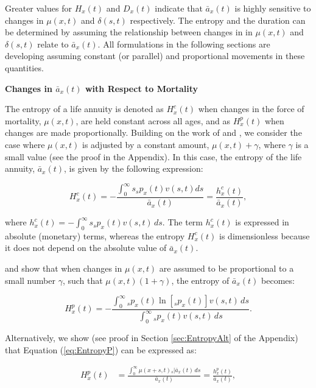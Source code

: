 \documentclass[12pt]{article}
\begin{document}
Greater values for ${H}_{x}(t)$ and ${D}_{x}(t)$ indicate that $\bar{a}_x(t)$ is highly sensitive to changes in $\mu(x,t)$ and $\delta(s,t)$ respectively. The entropy and the duration can be determined by assuming the relationship between changes in in $\mu(x,t)$ and $\delta(s,t)$ relate to $\bar{a}_x(t)$. All formulations in the following sections are developing assuming constant (or parallel) and proportional movements in these quantities.

\textbf{{Changes in $\bar{a}_x(t)$ with Respect to Mortality}}


The entropy of a life annuity is denoted as ${H}^{c}_{x}(t)$ when changes in the force of mortality, $\mu(x,t)$, are held constant across all ages, and as ${H}^{p}_{x}(t)$ when changes are made proportionally. Building on the work of \citet{Tsai2013a} and \citet{Lin2020}, we consider the case where $\mu(x,t)$ is adjusted by a constant amount, $\mu(x,t) + \gamma$, where $\gamma$ is a small value (see the proof in the Appendix). In this case, the entropy of the life annuity, $\bar{a}_x(t)$, is given by the following expression:


\begin{equation}\label{eq:EntropyC}
{H}^{c}_{x}(t) = -\frac{\int_{0}^\infty s {}_sp_x(t) {v}(s,t) ds}{\bar{a}_x(t)}=\frac{{h}^{c}_{x}(t)}{\bar{a}_x(t)},
\end{equation}

where ${h}^{c}_{x}(t)=-\int_{0}^\infty s {}_s p_x(t) {v}(s,t) \, ds$. The term ${h}^{c}_{x}(t)$ is expressed in absolute (monetary) terms, whereas the entropy ${H}^{c}_{x}(t)$ is dimensionless because it does not depend on the absolute value of $\bar{a}_x(t)$.

\citet{Haberman2011} and \citet{Tsai2013a} show that when changes in $\mu(x,t)$ are assumed to be proportional to a small number $\gamma$, such that $\mu(x,t)(1+\gamma)$, the entropy of $\bar{a}_x(t)$ becomes:

\begin{equation} \label{eq:EntropyP}
	{H}^{p}_{x}(t) = -\frac{ \int_{0}^{\infty}{}_s p_x(t)\ln\left[{}_s p_x(t)\right] {v}(s,t) \, ds}{\int_0^\infty {}_s p_x(t) {v}(s,t) \, ds}.
\end{equation}

Alternatively, we show (see proof in Section \ref{sec:EntropyAlt} of the Appendix) that Equation (\ref{eq:EntropyP}) can be expressed as:

\begin{equation} \label{eq:EntropyP2}
	\begin{split}
		{H}^{p}_{x}(t) &=  \frac{\int_0^\infty \mu(x+s,t)   {}_s|\bar{a}_x(t) \, ds}{\bar{a}_x(t)} =  \frac{{h}^{p}_{x}(t)}{\bar{a}_x(t)}, 
	\end{split}
\end{equation}
\end{document}
